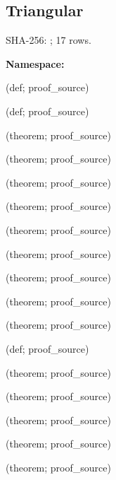 \subsection*{Triangular}
{\footnotesize SHA-256: ; 17 rows.}\par
\begingroup\small
\textbf{Namespace:} \par
\noindent{} {\scriptsize (def; proof\_source)}\par
\noindent{} {\scriptsize (def; proof\_source)}\par
\noindent{} {\scriptsize (theorem; proof\_source)}\par
\noindent{} {\scriptsize (theorem; proof\_source)}\par
\noindent{} {\scriptsize (theorem; proof\_source)}\par
\noindent{} {\scriptsize (theorem; proof\_source)}\par
\noindent{} {\scriptsize (theorem; proof\_source)}\par
\noindent{} {\scriptsize (theorem; proof\_source)}\par
\noindent{} {\scriptsize (theorem; proof\_source)}\par
\noindent{} {\scriptsize (theorem; proof\_source)}\par
\noindent{} {\scriptsize (theorem; proof\_source)}\par
\noindent{} {\scriptsize (def; proof\_source)}\par
\noindent{} {\scriptsize (theorem; proof\_source)}\par
\noindent{} {\scriptsize (theorem; proof\_source)}\par
\noindent{} {\scriptsize (theorem; proof\_source)}\par
\noindent{} {\scriptsize (theorem; proof\_source)}\par
\noindent{} {\scriptsize (theorem; proof\_source)}\par
\endgroup
